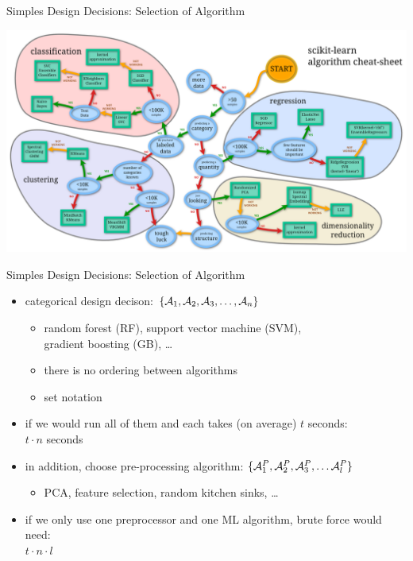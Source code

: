 \begin{frame}[c]{Simples Design Decisions: Selection of Algorithm}

\includegraphics[width=1.0\textwidth]{images/sklearn-cheat}


\end{frame}
\begin{frame}[c]{Simples Design Decisions: Selection of Algorithm}

\begin{itemize}
  \item categorical design decison: $\{ \mathcal{A}_1, \mathcal{A}_2, \mathcal{A}_3, \ldots, \mathcal{A}_n\}$
  \begin{itemize}
	\item random forest (RF), support vector machine (SVM),\\ gradient boosting (GB), \ldots
    \item there is no ordering between algorithms
    \item set notation
  \end{itemize}
  \pause
  \item if we would run all of them and each takes (on average) $t$ seconds:\\
  $t \cdot n$ seconds
  \pause
  \smallskip
  \item in addition, choose pre-processing algorithm: $\{\mathcal{A}_1^P, \mathcal{A}_2^P, \mathcal{A}_3^P, \ldots \mathcal{A}_l^P \}$
  \begin{itemize}
    \item PCA, feature selection, random kitchen sinks, \ldots
  \end{itemize}
  \item if we only use one preprocessor and one ML algorithm, brute force would need:\\
  $t \cdot n \cdot l$
\end{itemize}

\end{frame}
